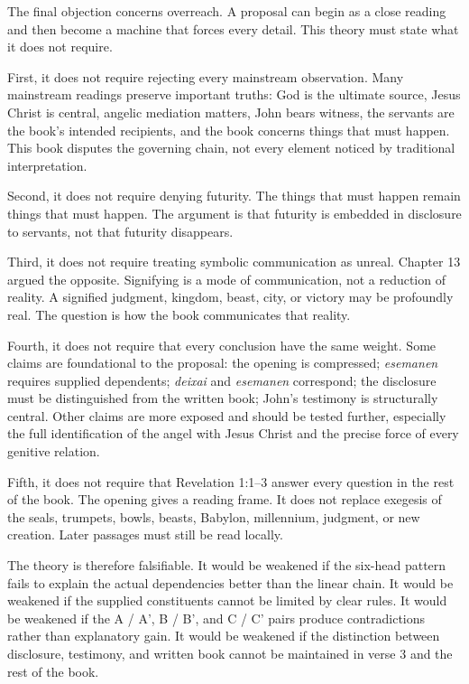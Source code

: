 The final objection concerns overreach. A proposal can begin as a close reading and then become a machine that forces every detail. This theory must state what it does not require.

First, it does not require rejecting every mainstream observation. Many mainstream readings preserve important truths: God is the ultimate source, Jesus Christ is central, angelic mediation matters, John bears witness, the servants are the book's intended recipients, and the book concerns things that must happen. This book disputes the governing chain, not every element noticed by traditional interpretation.

Second, it does not require denying futurity. The things that must happen remain things that must happen. The argument is that futurity is embedded in disclosure to servants, not that futurity disappears.

Third, it does not require treating symbolic communication as unreal. Chapter 13 argued the opposite. Signifying is a mode of communication, not a reduction of reality. A signified judgment, kingdom, beast, city, or victory may be profoundly real. The question is how the book communicates that reality.

Fourth, it does not require that every conclusion have the same weight. Some claims are foundational to the proposal: the opening is compressed; \textit{esemanen} requires supplied dependents; \textit{deixai} and \textit{esemanen} correspond; the disclosure must be distinguished from the written book; John's testimony is structurally central. Other claims are more exposed and should be tested further, especially the full identification of the angel with Jesus Christ and the precise force of every genitive relation.

Fifth, it does not require that Revelation 1:1--3 answer every question in the rest of the book. The opening gives a reading frame. It does not replace exegesis of the seals, trumpets, bowls, beasts, Babylon, millennium, judgment, or new creation. Later passages must still be read locally.

The theory is therefore falsifiable. It would be weakened if the six-head pattern fails to explain the actual dependencies better than the linear chain. It would be weakened if the supplied constituents cannot be limited by clear rules. It would be weakened if the A / A', B / B', and C / C' pairs produce contradictions rather than explanatory gain. It would be weakened if the distinction between disclosure, testimony, and written book cannot be maintained in verse 3 and the rest of the book.

